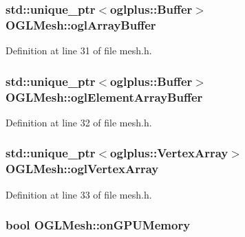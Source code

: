 \subsubsection[{ogl\+Array\+Buffer}]{\setlength{\rightskip}{0pt plus 5cm}std\+::unique\+\_\+ptr$<$oglplus\+::\+Buffer$>$ O\+G\+L\+Mesh\+::ogl\+Array\+Buffer\hspace{0.3cm}{\ttfamily [protected]}}\label{class_o_g_l_mesh_add6dba0a9c25b3861ddb1dae4ce61dc0}


Definition at line 31 of file mesh.\+h.

\hypertarget{class_o_g_l_mesh_aa6ee45949ecaec113ad8062d1b601bec}{}
\subsubsection[{ogl\+Element\+Array\+Buffer}]{\setlength{\rightskip}{0pt plus 5cm}std\+::unique\+\_\+ptr$<$oglplus\+::\+Buffer$>$ O\+G\+L\+Mesh\+::ogl\+Element\+Array\+Buffer\hspace{0.3cm}{\ttfamily [protected]}}\label{class_o_g_l_mesh_aa6ee45949ecaec113ad8062d1b601bec}


Definition at line 32 of file mesh.\+h.

\hypertarget{class_o_g_l_mesh_acf47aa123c36d1d06c2d71b13787b0e6}{}
\subsubsection[{ogl\+Vertex\+Array}]{\setlength{\rightskip}{0pt plus 5cm}std\+::unique\+\_\+ptr$<$oglplus\+::\+Vertex\+Array$>$ O\+G\+L\+Mesh\+::ogl\+Vertex\+Array\hspace{0.3cm}{\ttfamily [protected]}}\label{class_o_g_l_mesh_acf47aa123c36d1d06c2d71b13787b0e6}


Definition at line 33 of file mesh.\+h.

\hypertarget{class_o_g_l_mesh_aaa6cd7e62890961f6114d9753b7b3b58}{}
\subsubsection[{on\+G\+P\+U\+Memory}]{\setlength{\rightskip}{0pt plus 5cm}bool O\+G\+L\+Mesh\+::on\+G\+P\+U\+Memory\hspace{0.3cm}{\ttfamily [protected]}}\label{class_o_g_l_mesh_aaa6cd7e62890961f6114d9753b7b3b58}


